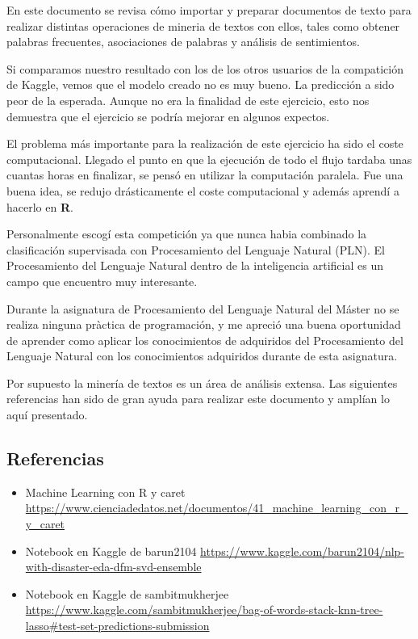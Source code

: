 \documentclass[]{article}
\begin{document}
En este documento se revisa cómo importar y preparar documentos de texto
para realizar distintas operaciones de mineria de textos con ellos,
tales como obtener palabras frecuentes, asociaciones de palabras y
análisis de sentimientos.

Si comparamos nuestro resultado con los de los otros usuarios de la
compatición de Kaggle, vemos que el modelo creado no es muy bueno. La
predicción a sido peor de la esperada. Aunque no era la finalidad de
este ejercicio, esto nos demuestra que el ejercicio se podría mejorar en
algunos expectos.

El problema más importante para la realización de este ejercicio ha sido
el coste computacional. Llegado el punto en que la ejecución de todo el
flujo tardaba unas cuantas horas en finalizar, se pensó en utilizar la
computación paralela. Fue una buena idea, se redujo drásticamente el
coste computacional y además aprendí a hacerlo en \textbf{R}.

Personalmente escogí esta competición ya que nunca habia combinado la
clasificación supervisada con Procesamiento del Lenguaje Natural (PLN).
El Procesamiento del Lenguaje Natural dentro de la inteligencia
artificial es un campo que encuentro muy interesante.

Durante la asignatura de Procesamiento del Lenguaje Natural del Máster
no se realiza ninguna pràctica de programación, y me apreció una buena
oportunidad de aprender como aplicar los conocimientos de adquiridos del
Procesamiento del Lenguaje Natural con los conocimientos adquiridos
durante de esta asignatura.

Por supuesto la minería de textos es un área de análisis extensa. Las
siguientes referencias han sido de gran ayuda para realizar este
documento y amplían lo aquí presentado.

\hypertarget{referencias}{%
\subsection{Referencias}\label{referencias}}

\begin{itemize}
\item
  Machine Learning con R y caret
  \url{https://www.cienciadedatos.net/documentos/41_machine_learning_con_r_y_caret}
\item
  Notebook en Kaggle de barun2104
  \url{https://www.kaggle.com/barun2104/nlp-with-disaster-eda-dfm-svd-ensemble}
\item
  Notebook en Kaggle de sambitmukherjee
  \url{https://www.kaggle.com/sambitmukherjee/bag-of-words-stack-knn-tree-lasso\#test-set-predictions-submission}
\end{itemize}
\end{document}
